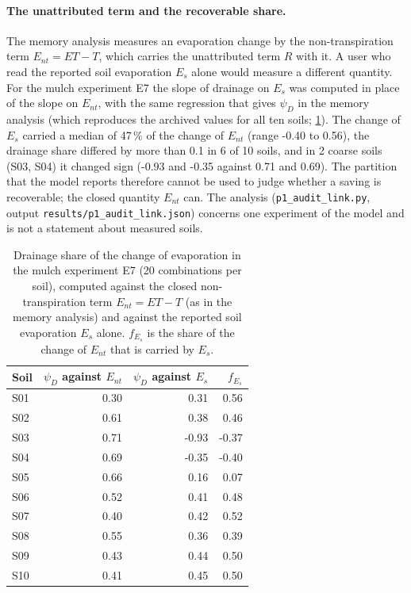 \documentclass[preprint,12pt,authoryear]{elsarticle}
\begin{document}
\paragraph{The unattributed term and the recoverable share.}\label{sec:auditlink}
The memory analysis measures an evaporation change by the non-transpiration term $E_{nt}=\mathit{ET}-T$, which carries the unattributed term $R$ with it. A user who read the reported soil evaporation $E_s$ alone would measure a different quantity. For the mulch experiment E7 the slope of drainage on $E_s$ was computed in place of the slope on $E_{nt}$, with the same regression that gives $\psi_D$ in the memory analysis (which reproduces the archived values for all ten soils; \cref{tab:auditlink}). The change of $E_s$ carried a median of 47\,\% of the change of $E_{nt}$ (range -0.40 to 0.56), the drainage share differed by more than 0.1 in 6 of 10 soils, and in 2 coarse soils (S03, S04) it changed sign (-0.93 and -0.35 against 0.71 and 0.69). The partition that the model reports therefore cannot be used to judge whether a saving is recoverable; the closed quantity $E_{nt}$ can. The analysis (\texttt{p1\_audit\_link.py}, output \texttt{results/p1\_audit\_link.json}) concerns one experiment of the model and is not a statement about measured soils.
\begin{table}[H]\centering\small
\caption{Drainage share of the change of evaporation in the mulch experiment E7 (20 combinations per soil), computed against the closed non-transpiration term $E_{nt}=\mathit{ET}-T$ (as in the memory analysis) and against the reported soil evaporation $E_s$ alone. $f_{E_s}$ is the share of the change of $E_{nt}$ that is carried by $E_s$.}\label{tab:auditlink}
\begin{tabular}{lrrr}\toprule
Soil & $\psi_D$ against $E_{nt}$ & $\psi_D$ against $E_s$ & $f_{E_s}$\\\midrule
S01 & 0.30 & 0.31 & 0.56\\
S02 & 0.61 & 0.38 & 0.46\\
S03 & 0.71 & -0.93 & -0.37\\
S04 & 0.69 & -0.35 & -0.40\\
S05 & 0.66 & 0.16 & 0.07\\
S06 & 0.52 & 0.41 & 0.48\\
S07 & 0.40 & 0.42 & 0.52\\
S08 & 0.55 & 0.36 & 0.39\\
S09 & 0.43 & 0.44 & 0.50\\
S10 & 0.41 & 0.45 & 0.50\\
\bottomrule\end{tabular}\end{table}
\end{document}
